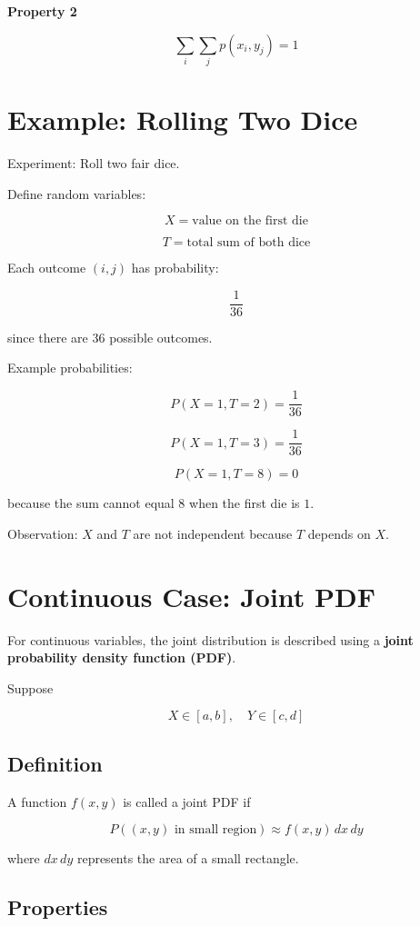 \documentclass[12pt,a4paper]{article}
\begin{document}
\textbf{Property 2}

\[
\sum_i \sum_j p(x_i,y_j) = 1
\]

\section{Example: Rolling Two Dice}

Experiment: Roll two fair dice.

Define random variables:

\[
X = \text{value on the first die}
\]

\[
T = \text{total sum of both dice}
\]

Each outcome $(i,j)$ has probability:

\[
\frac{1}{36}
\]

since there are $36$ possible outcomes.

Example probabilities:

\[
P(X=1,T=2)=\frac{1}{36}
\]

\[
P(X=1,T=3)=\frac{1}{36}
\]

\[
P(X=1,T=8)=0
\]

because the sum cannot equal $8$ when the first die is $1$.

Observation: $X$ and $T$ are not independent because $T$ depends on $X$.

\section{Continuous Case: Joint PDF}

For continuous variables, the joint distribution is described using a \textbf{joint probability density function (PDF)}.

Suppose

\[
X \in [a,b], \quad Y \in [c,d]
\]

\subsection{Definition}

A function $f(x,y)$ is called a joint PDF if

\[
P((x,y)\text{ in small region}) \approx f(x,y)\,dx\,dy
\]

where $dx\,dy$ represents the area of a small rectangle.

\subsection{Properties}
\end{document}
